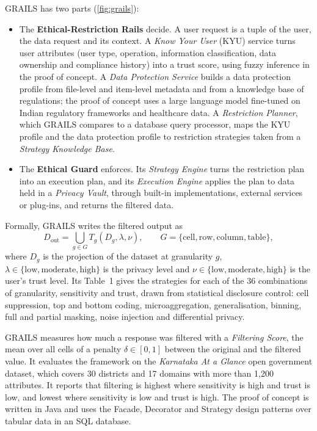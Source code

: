 GRAILS has two parts (\cref{fig:grails}):
\begin{itemize}
  \item The \textbf{Ethical-Restriction Rails} decide. A user request is a tuple of the user, the data request and its
        context.
        A \emph{Know Your User} (KYU) service turns user attributes (user type,
        operation, information classification, data ownership and compliance
        history) into a trust score, using fuzzy inference in the proof of
        concept. A \emph{Data Protection Service} builds a data protection
        profile from file-level and item-level metadata and from a knowledge
        base of regulations; the proof of concept uses a large language model
        fine-tuned on Indian regulatory frameworks and healthcare data. A
        \emph{Restriction Planner}, which GRAILS compares to a database query
        processor, maps the KYU profile and the data protection profile to
        restriction strategies taken from a \emph{Strategy Knowledge Base}.
  \item The \textbf{Ethical Guard} enforces. Its \emph{Strategy Engine} turns
        the restriction plan into an execution plan, and its \emph{Execution
        Engine} applies the plan to data held in a \emph{Privacy Vault}, through
        built-in implementations, external services or plug-ins, and returns
        the filtered data.
\end{itemize}

Formally, GRAILS writes the filtered output as
\begin{equation}
  D_{\text{out}} = \bigcup_{g \in G} T_g(D_g, \lambda, \nu),
  \qquad G = \{\text{cell}, \text{row}, \text{column}, \text{table}\},
\end{equation}
where \(D_g\) is the projection of the dataset at granularity \(g\),
\(\lambda \in \{\text{low}, \text{moderate}, \text{high}\}\) is the privacy level
and \(\nu \in \{\text{low}, \text{moderate}, \text{high}\}\) is the user's trust
level. Its Table~1 gives the strategies for each of the 36 combinations of
granularity, sensitivity and trust, drawn from statistical disclosure control:
cell suppression, top and bottom coding, microaggregation, generalisation,
binning, full and partial masking, noise injection and differential privacy.

GRAILS measures how much a response was filtered with a \emph{Filtering Score},
the mean over all cells of a penalty \(\delta \in [0,1]\) between the original
and the filtered value. It evaluates the framework on the \emph{Karnataka At a
Glance} open government dataset, which covers 30 districts and 17 domains with
more than 1,200 attributes. It reports that filtering is highest where
sensitivity is high and trust is low, and lowest where sensitivity is low and
trust is high. The proof of concept is written in Java and uses the Facade,
Decorator and Strategy design patterns over tabular data in an SQL database.

